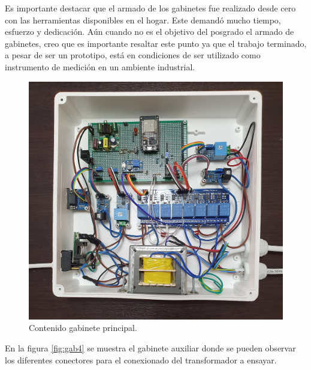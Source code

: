 Es importante destacar que el armado de los gabinetes fue realizado desde cero con las herramientas disponibles en el hogar. Este demandó mucho tiempo, esfuerzo y dedicación. Aún cuando no es el objetivo del posgrado el armado de gabinetes, creo que es importante resaltar este punto ya que el trabajo terminado, a pesar de ser un prototipo, está en condiciones de ser utilizado como instrumento de medición en un ambiente industrial.

\begin{figure}[h]
	\centering
	\includegraphics[scale=0.11, angle=270]{./Figures/gab3.jpg}
	\caption{Contenido gabinete principal.}
	\label{fig:gab3}
\end{figure}

\pagebreak

En la figura \ref{fig:gab4} se muestra el gabinete auxiliar donde se pueden observar los diferentes conectores para el conexionado del transformador a ensayar.

